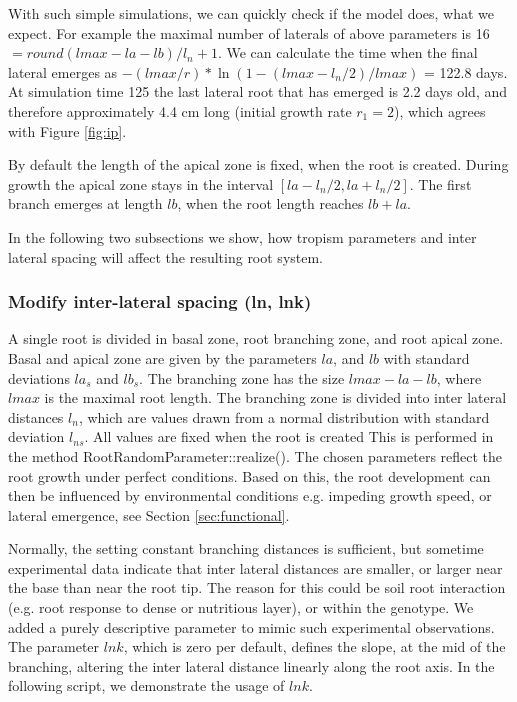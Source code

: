 With such simple simulations, we can quickly check if the model does, what we expect. For example the maximal number of laterals of above parameters is 16 
$= round(lmax - la - lb)/l_n +  1$. We can calculate the time when the final lateral emerges as $-(lmax/r)*\ln(1-(lmax-l_n/2)/lmax)$ = 122.8 days. At simulation time 125 the last lateral root that has emerged is 2.2 days old, and therefore approximately 4.4 cm long (initial growth rate $r_1 = 2$), which agrees with Figure \ref{fig:ip}.

By default the length of the apical zone is fixed, when the root is created. During growth the apical zone stays in the interval $[la - l_n/2, la+l_n/2]$. The first branch emerges at length $lb$, when the root length reaches $lb +la$.

In the following two subsections we show, how tropism parameters and inter lateral spacing will affect the resulting root system.


\subsubsection*{Modify inter-lateral spacing (ln, lnk)} 

A single root is divided in basal zone, root branching zone, and root apical zone. Basal and apical zone are given by the parameters $la$, and $lb$ with standard deviations $la_s$ and $lb_s$. The branching zone has the size $lmax-la-lb$, where $lmax$ is the maximal root length. The branching zone is divided into inter lateral distances $l_n$, which are values drawn from a normal distribution with standard deviation $l_{ns}$. All values are fixed when the root is created This is performed in the method RootRandomParameter::realize(). The chosen parameters reflect the root growth under perfect conditions. Based on this, the root development can then be influenced by environmental conditions e.g. impeding growth speed, or lateral emergence, see Section \ref{sec:functional}.

Normally, the setting constant branching distances is sufficient, but sometime experimental data indicate that inter lateral distances are smaller, or larger near the base than near the root tip. The reason for this could be soil root interaction (e.g. root response to dense or nutritious layer), or within the genotype. We added a purely descriptive parameter to mimic such experimental observations. The parameter $lnk$, which is zero per default, defines the slope, at the mid of the branching, altering the inter lateral distance linearly along the root axis. In the following script, we demonstrate the usage of $lnk$.

